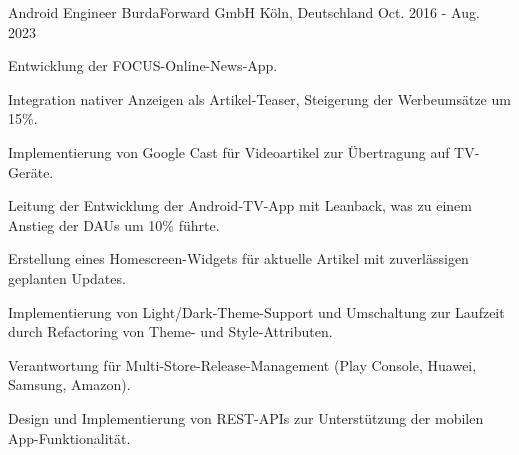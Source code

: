 \begin{cventries}

  \cventry
    {Android Engineer} %
    {BurdaForward GmbH} %
    {Köln, Deutschland} %
    {Oct. 2016 - Aug. 2023} %
    {
      \begin{cvitems} %
        \item {Entwicklung der FOCUS-Online-News-App.}
        \item {Integration nativer Anzeigen als Artikel-Teaser, Steigerung der Werbeumsätze um 15\%.}
        \item {Implementierung von Google Cast für Videoartikel zur Übertragung auf TV-Geräte.}
        \item {Leitung der Entwicklung der Android-TV-App mit Leanback, was zu einem Anstieg der DAUs um 10\% führte.}
        \item {Erstellung eines Homescreen-Widgets für aktuelle Artikel mit zuverlässigen geplanten Updates.}
        \item {Implementierung von Light/Dark-Theme-Support und Umschaltung zur Laufzeit durch Refactoring von Theme- und Style-Attributen.}
        \item {Verantwortung für Multi-Store-Release-Management (Play Console, Huawei, Samsung, Amazon).}
        \item {Design und Implementierung von REST-APIs zur Unterstützung der mobilen App-Funktionalität. }
      \end{cvitems}
    }
    

\end{cventries}
